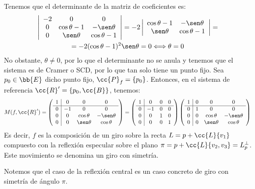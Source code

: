 \begin{enumerate}
    Tenemos que el determinante de la matriz de coeficientes es:
    \begin{multline*}
        \left|\begin{array}{ccc}
            -2 & 0 & 0 \\
            0 & \cos\theta-1 & -\sen\theta \\
            0 & \sen\theta & \cos\theta-1 \\
        \end{array}\right|
        = -2 \left|\begin{array}{cc}
            \cos\theta-1 & -\sen\theta \\
            \sen\theta & \cos\theta-1 \\
        \end{array}\right|
        =\\= -2(\cos\theta -1)^2\sen\theta = 0 \Longleftrightarrow \theta = 0
    \end{multline*}
    No obstante, $\theta\neq 0$, por lo que el determinante no se anula y tenemos que el sistema es de Cramer o SCD, por lo que tan solo tiene un punto fijo. Sea $p_0\in \bb{E}$ dicho punto fijo, $\cc{P}_f = \{p_0\}$. Entonces, en el sistema de referencia $\cc{R}'=\{p_0,\cc{B}\}$, tenemos:
    \begin{equation*}
        M(f,\cc{R}') = \left(\begin{array}{c|ccc}
            1 & 0 & 0 & 0 \\ \hline
            0 & -1 & 0 & 0 \\
            0 & 0 & \cos\theta & -\sen\theta \\
            0 & 0 & \sen\theta & \cos\theta \\
        \end{array}\right)
        = \left(\begin{array}{c|ccc}
            1 & 0 & 0 & 0 \\ \hline
            0 & -1 & 0 & 0 \\
            0 & 0 & 1 & 0 \\
            0 & 0 & 0 & 1 \\
        \end{array}\right)
        \left(\begin{array}{c|ccc}
            1 & 0 & 0 & 0 \\ \hline
            0 & 1 & 0 & 0 \\
            0 & 0 & \cos\theta & -\sen\theta \\
            0 & 0 & \sen\theta & \cos\theta \\
        \end{array}\right)
    \end{equation*}
    Es decir, $f$ es la composición de un giro sobre la recta $L=p+\cc{L}\{v_1\}$  compuesto con la reflexión especular sobre el plano $\pi=p+\cc{L}\{v_2,v_3\} = L_p^\perp$. Este movimiento se denomina un giro con simetría.
    \begin{observacion}
        Notemos que el caso de la reflexión central es un caso concreto de giro con simetría de ángulo $\pi$.
    \end{observacion}    
\end{enumerate}

